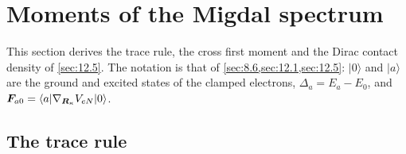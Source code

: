 \section{Moments of the Migdal spectrum}\label{app:D.34}

This section derives the trace rule, the cross first moment and the Dirac contact density of \cref{sec:12.5}. The notation is that of \cref{sec:8.6,sec:12.1,sec:12.5}: $|0\rangle$ and $|a\rangle$ are the ground and excited states of the clamped electrons, $\Delta_a = E_a - E_0$, and $\bm{F}_{a0} = \langle a|\nabla_{\bm{R}_\kappa}V_{eN}|0\rangle$.

\subsection{The trace rule}\label{app:D.34-trace}


